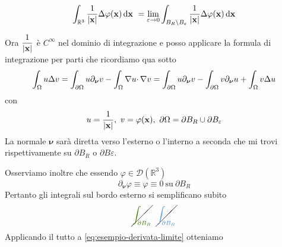 \begin{enumerate}
\begin{figure}[htpb]
\begin{tikzpicture}[x=0.75pt,y=0.75pt,yscale=-1,xscale=1]
              \end{tikzpicture}
          \end{figure}
          \FloatBarrier
          \begin{equation}
              \int _{\mathbb{R}^{3}}\frac{1}{| \x| } \Delta \varphi (\x) \dxx \ =\lim _{\varepsilon \rightarrow 0}\int _{B_{R} \backslash B_{\varepsilon }}\frac{1}{| \x| } \Delta \varphi (\x) \dxx
              \label{eq:esempio-derivata-limite}
          \end{equation}
\end{enumerate}

Ora $\displaystyle \frac{1}{| \x| }$ è $\displaystyle C^{\infty }$ nel dominio di integrazione e posso applicare la formula di integrazione per parti che ricordiamo qua sotto
\begin{equation*}
    \int _{\Omega } u\Delta v=\int _{\partial \Omega } u\partial _{\nuu} v-\int _{\Omega } \nabla u\cdotp \nabla v=\int _{\partial \Omega } u\partial _{\bm{\nu }} v-\int _{\partial \Omega } v\partial _{\bm{\nu }} u+\int _{\Omega } v\Delta u
\end{equation*}
con
\begin{equation*}
    u=\frac{1}{| \x| } ,\ v=\varphi (\x) ,\ \partial \Omega =\partial B_{R} \cup \partial B_{\varepsilon }
\end{equation*}
La normale $\displaystyle \bm{\nu }$ sarà diretta verso l'esterno o l'interno a seconda che mi trovi rispettivamente su $\displaystyle \partial B_{R}$ o $\displaystyle \partial B\varepsilon $.

Osserviamo inoltre che essendo $\displaystyle \varphi \in \mathcal{D}\left(\mathbb{R}^{3}\right)$
\begin{equation*}
    \partial _{\bm{\nu }} \varphi \equiv \varphi \equiv 0\ \text{su} \ \partial B_{R}
\end{equation*}
Pertanto gli integrali sul bordo esterno si semplificano subito
\begin{equation*}
    \cancel{\textcolor[rgb]{0.25,0.46,0.02}{\int _{\partial B_{R}}}} \ \ \cancel{\textcolor[rgb]{0.29,0.56,0.89}{\int _{\partial B_{R}}}}
\end{equation*}
Applicando il tutto a \eqref{eq:esempio-derivata-limite} otteniamo

